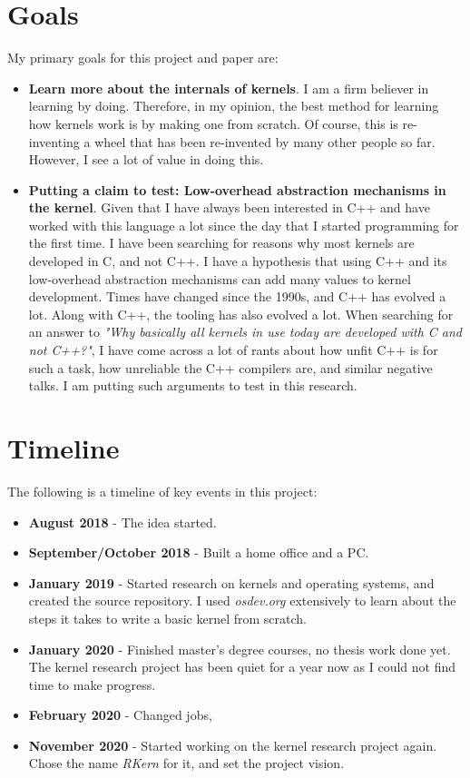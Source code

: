 \documentclass[a4paper,12pt,twoside]{report}
\begin{document}
	    \section{Goals}
	        My primary goals for this project and paper are:
	        \begin{itemize}
	            \item \textbf{Learn more about the internals of kernels}.
	            I am a firm believer in learning by doing. Therefore, in my opinion, the best method for learning how kernels work is by making one from scratch. Of course, this is re-inventing a wheel that has been re-invented by many other people so far. However, I see a lot of value in doing this.

	            \item \textbf{Putting a claim to test: Low-overhead abstraction mechanisms in the kernel}.
	            Given that I have always been interested in C++ and have worked with this language a lot since the day that I started programming for the first time. I have been searching for reasons why most kernels are developed in C, and not C++. I have a hypothesis that using C++ and its low-overhead abstraction mechanisms can add many values to kernel development. Times have changed since the 1990s, and C++ has evolved a lot. Along with C++, the tooling has also evolved a lot. When searching for an answer to \textit{"Why basically all kernels in use today are developed with C and not C++?"}, I have come across a lot of rants about how unfit C++ is for such a task, how unreliable the C++ compilers are, and similar negative talks. I am putting such arguments to test in this research.
	        \end{itemize}

	    \section*{Timeline}
	        The following is a timeline of key events in this project:
	        \begin{itemize}
	            \item \textbf{August 2018} - The idea started.
	            \item \textbf{September/October 2018} - Built a home office and a PC.
	            \item \textbf{January 2019} - Started research on kernels and operating systems, and created the source repository. I used \textit{osdev.org}\cite{osdev} extensively to learn about the steps it takes to write a basic kernel from scratch.
	            \item \textbf{January 2020} - Finished master's degree courses, no thesis work done yet. The kernel research project has been quiet for a year now as I could not find time to make progress.
	            \item \textbf{February 2020} - Changed jobs,
	            \item \textbf{November 2020} - Started working on the kernel research project again. Chose the name \textit{RKern} for it, and set the project vision.
	        \end{itemize}
\end{document}
